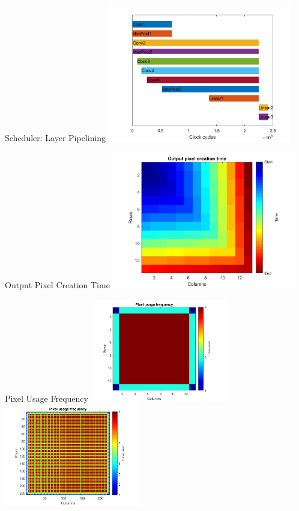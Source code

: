 \begin{frame}{Scheduler: Layer Pipelining}
	\centering
	\includegraphics[width=0.6\textwidth]{../Images/Scheduling/Pipelined-1x.png}\\
\end{frame}

\begin{frame}{Output Pixel Creation Time}
	\centering
	\includegraphics[width=0.6\textwidth]{../Images/Scheduling/Conv5-output-creation-time.png}\\
\end{frame}

\begin{frame}{Pixel Usage Frequency}
	\centering
	\includegraphics[width=0.45\textwidth]{../Images/Scheduling/Conv5-pixel-frequency.png}
	\includegraphics[width=0.45\textwidth]{../Images/Scheduling/Conv1-pixel-frequency.png}\\
\end{frame}

